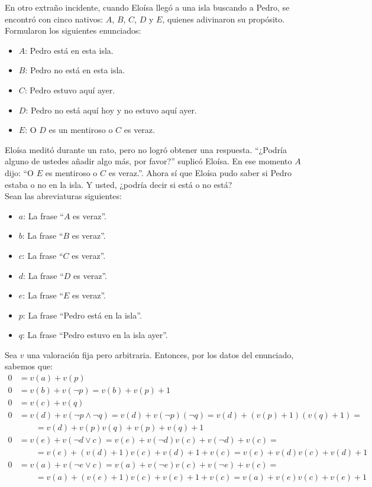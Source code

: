 \begin{ejercicio}
    En otro extraño incidente, cuando Eloísa llegó a una isla buscando a Pedro, se encontró
    con cinco nativos: $A$, $B$, $C$, $D$ y $E$, quienes adivinaron su propósito. Formularon los siguientes enunciados:
    \begin{itemize}
        \item $A$: Pedro está en esta isla.
        \item $B$: Pedro no está en esta isla.
        \item $C$: Pedro estuvo aquí ayer.
        \item $D$: Pedro no está aquí hoy y no estuvo aquí ayer.
        \item $E$: O $D$ es un mentiroso o $C$ es veraz.
    \end{itemize}

    Eloísa meditó durante un rato, pero no logró obtener una respuesta. ``¿Podría alguno de ustedes añadir
    algo más, por favor?'' suplicó Eloísa. En ese momento $A$ dijo: ``O $E$ es mentiroso o $C$ es veraz.''. Ahora sí
    que Eloísa pudo saber si Pedro estaba o no en la isla. Y usted, ¿podría decir si está o no está?\\

    Sean las abreviaturas siguientes:
    \begin{itemize}
        \item $a$: La frase ``$A$ es veraz''.
        \item $b$: La frase ``$B$ es veraz''.
        \item $c$: La frase ``$C$ es veraz''.
        \item $d$: La frase ``$D$ es veraz''.
        \item $e$: La frase ``$E$ es veraz''.
        \item $p$: La frase ``Pedro está en la isla''.
        \item $q$: La frase ``Pedro estuvo en la isla ayer''.
    \end{itemize}

    Sea $v$ una valoración fija pero arbitraria. Entonces, por los datos del enunciado, sabemos que:
    \begin{align*}
        0 &= v(a) + v(p)\\
        0 &= v(b) + v(\lnot p) = v(b) + v(p) + 1\\
        0 &= v(c) + v(q)\\
        0 &= v(d) + v(\lnot p \land \lnot q) = v(d) + v(\lnot p)(\lnot q) = v(d) + (v(p)+1)(v(q)+1) =\\&\qquad = v(d) + v(p)v(q) + v(p) + v(q) + 1\\
        0 &= v(e) + v(\lnot d \lor c) = v(e) + v(\lnot d)v(c) + v(\lnot d) + v(c) =\\&\qquad= v(e) + (v(d)+1)v(c) + v(d) + 1 + v(c) = v(e) + v(d)v(c) + v(d) + 1\\
        0 &= v(a) + v(\lnot e \lor c) = v(a) + v(\lnot e)v(c) + v(\lnot e) + v(c) =\\&\qquad= v(a) + (v(e)+1)v(c) + v(e) + 1 + v(c) = v(a) + v(e)v(c) + v(e) + 1
    \end{align*}


\end{ejercicio}
